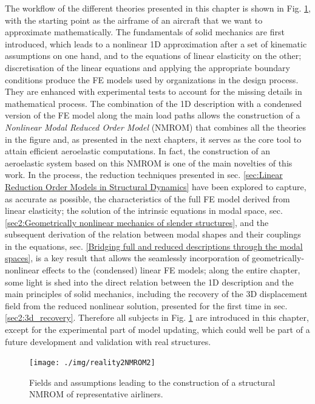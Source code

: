 \documentclass[11pt]{article}
\begin{document}
The workflow of the different theories presented in this chapter is shown in Fig. \ref{fig2:aircraft2NMROM}, with the starting point as the  airframe of an aircraft that we want to approximate mathematically. The fundamentals of solid mechanics are first introduced, which leads to a  nonlinear 1D approximation after a set of kinematic assumptions on one hand, and to the equations of linear elasticity on the other; discretisation of the linear equations and applying the appropriate boundary conditions produce the FE models used by organizations in the design process. They are enhanced with experimental tests to account for the missing details in mathematical process. The combination of the 1D description with a condensed version of the FE model along the main load paths allows the construction of a \emph{Nonlinear Modal Reduced Order Model} (NMROM) that combines all the theories in the figure and, as presented in the next chapters, it  serves as the core tool to attain efficient aeroelastic computations. In fact, the construction of an aeroelastic system based on this NMROM is one of the main novelties of this work. In the process, the reduction techniques presented in sec. \ref{sec:Linear Reduction Order Models in Structural Dynamics} have been explored to capture, as accurate as possible, the characteristics of the full FE model derived from linear elasticity; the solution of the intrinsic equations in modal space, sec. \ref{sec2:Geometrically nonlinear mechanics of slender structures}, and  the subsequent derivation of the relation between modal shapes and their couplings in the equations, sec. \ref{Bridging full and reduced descriptions through the modal spaces},  is a key result that allows the seamlessly incorporation of geometrically-nonlinear effects to the (condensed) linear FE models;  along the entire chapter, some light is shed into the direct relation between the 1D description and the main principles of solid mechanics, including the recovery of the 3D displacement field from the reduced nonlinear solution, presented for the first  time in sec. \ref{sec2:3d_recovery}. Therefore all subjects in Fig. \ref{fig2:aircraft2NMROM} are introduced in this chapter, except for the experimental part of model updating, which could well be part of a future development and validation with real structures. 
%
\begin{figure}[h!]
\centering
\texttt{[image: ./img/reality2NMROM2]}
\caption{Fields and assumptions leading to the construction of a structural  NMROM of representative airliners.}\label{fig2:aircraft2NMROM}
\end{figure}
\end{document}
